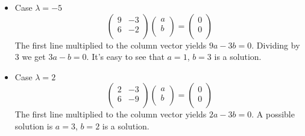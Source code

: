 \documentclass[12pt]{report}
\begin{document}
\begin{itemize}
\item  Case $\lambda = -5$
$$\begin{pmatrix} 9 & -3 \\ 6 & -2 \\ \end{pmatrix} \begin{pmatrix} a \\ b \\ \end{pmatrix} =\begin{pmatrix} 0 \\ 0 \\ \end{pmatrix} $$
The first line multiplied to the column vector yields $9a-3b=0$. Dividing by $3$ we get $3a-b=0$. It's easy to see that $a=1$, $b=3$ is a solution.
\item  Case $\lambda = 2$
$$\begin{pmatrix} 2 & -3 \\ 6 & -9 \\ \end{pmatrix} \begin{pmatrix} a \\ b \\ \end{pmatrix} =\begin{pmatrix} 0 \\ 0 \\ \end{pmatrix} $$
The first line multiplied to the column vector yields $2a-3b=0$. A possible solution is $a=3$, $b=2$ is a solution.
\end{itemize}
\end{document}
